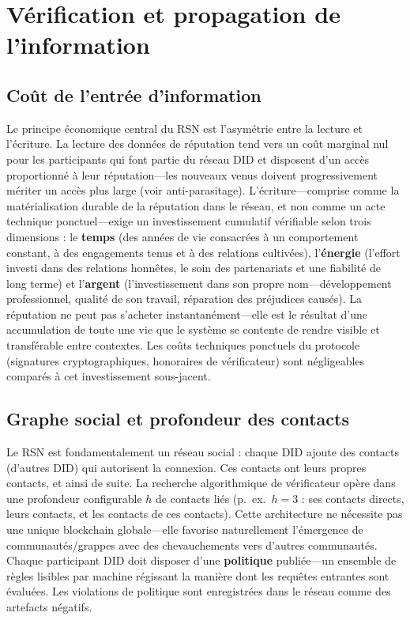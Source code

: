 \documentclass[11pt,a4paper,twocolumn]{article}
\begin{document}
\section{Vérification et propagation de l'information}

\subsection{Coût de l'entrée d'information}

Le principe économique central du RSN est l'asymétrie entre la lecture et l'écriture. La lecture des données de réputation tend vers un coût marginal nul pour les participants qui font partie du réseau DID et disposent d'un accès proportionné à leur réputation---les nouveaux venus doivent progressivement mériter un accès plus large (voir anti-parasitage). L'écriture---comprise comme la matérialisation durable de la réputation dans le réseau, et non comme un acte technique ponctuel---exige un investissement cumulatif vérifiable selon trois dimensions : le \textbf{temps} (des années de vie consacrées à un comportement constant, à des engagements tenus et à des relations cultivées), l'\textbf{énergie} (l'effort investi dans des relations honnêtes, le soin des partenariats et une fiabilité de long terme) et l'\textbf{argent} (l'investissement dans son propre nom---développement professionnel, qualité de son travail, réparation des préjudices causés). La réputation ne peut pas s'acheter instantanément---elle est le résultat d'une accumulation de toute une vie que le système se contente de rendre visible et transférable entre contextes. Les coûts techniques ponctuels du protocole (signatures cryptographiques, honoraires de vérificateur) sont négligeables comparés à cet investissement sous-jacent.

\subsection{Graphe social et profondeur des contacts}

Le RSN est fondamentalement un réseau social : chaque DID ajoute des contacts (d'autres DID) qui autorisent la connexion. Ces contacts ont leurs propres contacts, et ainsi de suite. La recherche algorithmique de vérificateur opère dans une profondeur configurable $h$ de contacts liés (p.\ ex.\ $h=3$ : ses contacts directs, leurs contacts, et les contacts de ces contacts). Cette architecture ne nécessite pas une unique blockchain globale---elle favorise naturellement l'émergence de communautés/grappes avec des chevauchements vers d'autres communautés. Chaque participant DID doit disposer d'une \textbf{politique} publiée---un ensemble de règles lisibles par machine régissant la manière dont les requêtes entrantes sont évaluées. Les violations de politique sont enregistrées dans le réseau comme des artefacts négatifs.
\end{document}
